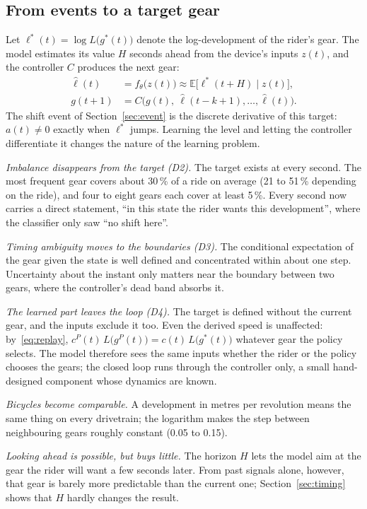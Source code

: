 \documentclass[conference]{IEEEtran}
\newcommand{\lhat}{\hat{\ell}}
\newcommand{\pct}{\,\%}
\begin{document}
\subsection{From events to a target gear}
Let $\ell^*(t) = \log L\big(g^*(t)\big)$ denote the log-development of the rider's gear. The model estimates its value $H$ seconds ahead from the device's inputs $z(t)$, and the controller $C$ produces the next gear:
\begin{align}
\lhat(t) &= f_\theta\big(z(t)\big) \approx \mathbb{E}\big[\ell^*(t+H) \mid z(t)\big], \\
g(t+1) &= C\big(g(t),\ \lhat(t-k+1), \dots, \lhat(t)\big).
\end{align}
The shift event of Section~\ref{sec:event} is the discrete derivative of this target: $a(t) \neq 0$ exactly when $\ell^*$ jumps. Learning the level and letting the controller differentiate it changes the nature of the learning problem.

\emph{Imbalance disappears from the target (D2).} The target exists at every second. The most frequent gear covers about 30\pct{} of a ride on average (21 to 51\pct{} depending on the ride), and four to eight gears each cover at least 5\pct{}. Every second now carries a direct statement, ``in this state the rider wants this development'', where the classifier only saw ``no shift here''.

\emph{Timing ambiguity moves to the boundaries (D3).} The conditional expectation of the gear given the state is well defined and concentrated within about one step. Uncertainty about the instant only matters near the boundary between two gears, where the controller's dead band absorbs it.

\emph{The learned part leaves the loop (D4).} The target is defined without the current gear, and the inputs exclude it too. Even the derived speed is unaffected: by~\eqref{eq:replay}, $c^P(t)\,L\big(g^P(t)\big) = c(t)\,L\big(g^*(t)\big)$ whatever gear the policy selects. The model therefore sees the same inputs whether the rider or the policy chooses the gears; the closed loop runs through the controller only, a small hand-designed component whose dynamics are known.

\emph{Bicycles become comparable.} A development in metres per revolution means the same thing on every drivetrain; the logarithm makes the step between neighbouring gears roughly constant (0.05 to 0.15).

\emph{Looking ahead is possible, but buys little.} The horizon $H$ lets the model aim at the gear the rider will want a few seconds later. From past signals alone, however, that gear is barely more predictable than the current one; Section~\ref{sec:timing} shows that $H$ hardly changes the result.
\end{document}
